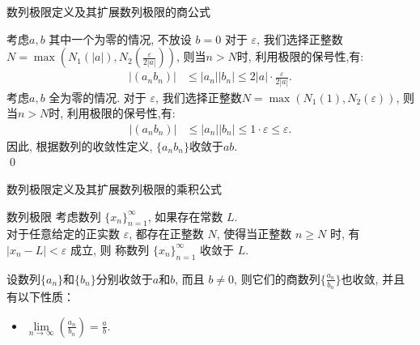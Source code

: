 \documentclass[
10pt,
aspectratio=43,
]{beamer}
\begin{document}
\begin{frame}{数列极限定义及其扩展}{数列极限的商公式}
    \begin{block}{}
        考虑$a,b$ 其中一个为零的情况, 不放设 $b=0$ 对于 $\varepsilon$, 我们选择正整数$N = \max(N_1(|a|), N_2(\frac{\varepsilon}{2|a|}))$, 则当$n > N$时, 利用极限的保号性,有:
        \begin{align*}
            |(a_n b_n)| & \leq |a_n||b_n|\leq 2|a|\cdot\frac{\varepsilon}{2|a|}.
        \end{align*}
        \vspace{0.5cm}
        考虑$a,b$ 全为零的情况.  对于 $\varepsilon$, 我们选择正整数$N = \max(N_1(1),N_2(\varepsilon))$, 则当$n > N$时, 利用极限的保号性,有:
        \begin{align*}
            |(a_n b_n)| & \leq |a_n||b_n|\leq 1\cdot\varepsilon\leq \varepsilon.
        \end{align*}
        因此, 根据数列的收敛性定义, $\{a_n  b_n\}$收敛于$a  b$.\\\qed
    \end{block}
\end{frame}


\begin{frame}{数列极限定义及其扩展}{数列极限的乘积公式}
    \begin{block}{数列极限}
        考虑数列 $\{x_n\}_{n=1}^\infty$, 如果存在{\color{green}常数 $L$}.\\
        {\color{blue}对于任意给定的正实数 $\varepsilon$}, 都存在{\color{red}正整数 $N$, 使得当正整数 $n\geq N$ 时}, {\color{blue}有 $|x_n - L| < \varepsilon$ 成立}, 则{\color{green} 称数列 $\{x_n\}_{n=1}^\infty$ 收敛于 $L$}.
    \end{block}
    \begin{block}{}
        设数列$\{a_n\}$和$\{b_n\}$分别收敛于$a$和$b$, 而且 $b\neq0$, 则它们的商数列$\{\frac{a_n}{b_n}\}$也收敛, 并且有以下性质：
        \begin{itemize}
            \item $\lim\limits_{n \to \infty}\left(\displaystyle\frac{a_n}{b_n}\right) = \displaystyle\frac{a}{b}$.
        \end{itemize}
    \end{block}
\end{frame}
\end{document}
